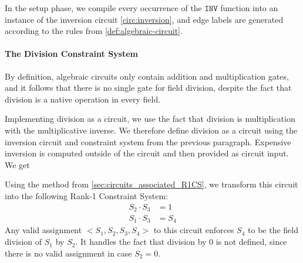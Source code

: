 In the setup phase, we compile every occurrence of the $\mathtt{INV}$ function into an instance of the inversion circuit \ref{circ:inversion}, and edge labels are generated according to the rules from \ref{def:algebraic-circuit}.
\paragraph{The Division Constraint System} By definition, algebraic circuits only contain addition and multiplication gates, and it follows that there is no single gate for field division, despite the fact that division is a native operation in every field.

Implementing division as a circuit, we use the fact that division is multiplication with the multiplicative inverse. We therefore define division as a circuit using the inversion circuit and constraint system from the previous paragraph. Expensive inversion is computed outside of the circuit and then provided as circuit input. We get 
\begin{center}
\end{center} 
Using the method from \ref{sec:circuits_associated_R1CS}, we transform this circuit into the following Rank-1 Constraint System:
\begin{align*}
S_2 \cdot S_3 &= 1\\
S_1 \cdot S_3 &= S_4
\end{align*}
Any valid assignment $<S_1,S_2,S_3,S_4>$ to this circuit enforces $S_4$ to be the field division of $S_1$ by $S_2$. It handles the fact that division by $0$ is not defined, since there is no valid assignment in case $S_2=0$. 

